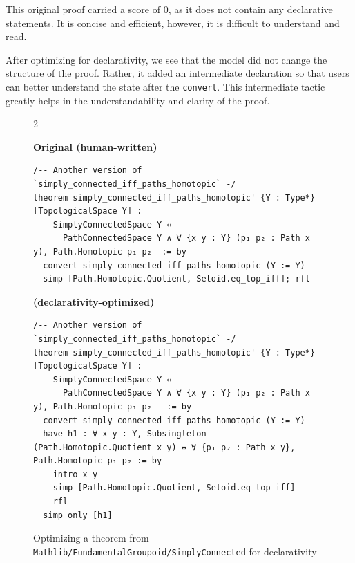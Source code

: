 This original proof carried a score of $0$, as it does not contain any declarative statements. It is concise and efficient, however, it is difficult to understand and read. 

After optimizing for declarativity, we see that the model did not change the structure of the proof. Rather, it added an intermediate declaration so that users can better understand the state after the \texttt{convert}. This intermediate tactic greatly helps in the understandability and clarity of the proof.


\setlength{\columnsep}{0.2cm}
\begin{figure}[ht]
\begin{multicols}{2}

{
\textbf{Original (human-written)}
\begin{scriptsize}
\begin{lstlisting}[basicstyle=\scriptsize\ttfamily]
/-- Another version of `simply_connected_iff_paths_homotopic` -/
theorem simply_connected_iff_paths_homotopic' {Y : Type*} [TopologicalSpace Y] :
    SimplyConnectedSpace Y ↔
      PathConnectedSpace Y ∧ ∀ {x y : Y} (p₁ p₂ : Path x y), Path.Homotopic p₁ p₂  := by
  convert simply_connected_iff_paths_homotopic (Y := Y)
  simp [Path.Homotopic.Quotient, Setoid.eq_top_iff]; rfl
\end{lstlisting}
\end{scriptsize}
}
\vfill\null
\columnbreak
{
\textbf{\methodname{} (declarativity-optimized)}
\begin{scriptsize}
\begin{lstlisting}[basicstyle=\scriptsize\ttfamily]
/-- Another version of `simply_connected_iff_paths_homotopic` -/
theorem simply_connected_iff_paths_homotopic' {Y : Type*} [TopologicalSpace Y] :
    SimplyConnectedSpace Y ↔
      PathConnectedSpace Y ∧ ∀ {x y : Y} (p₁ p₂ : Path x y), Path.Homotopic p₁ p₂   := by
  convert simply_connected_iff_paths_homotopic (Y := Y)
  have h1 : ∀ x y : Y, Subsingleton (Path.Homotopic.Quotient x y) ↔ ∀ {p₁ p₂ : Path x y}, Path.Homotopic p₁ p₂ := by
    intro x y
    simp [Path.Homotopic.Quotient, Setoid.eq_top_iff]
    rfl
  simp only [h1]
\end{lstlisting}
\end{scriptsize}
}
\end{multicols}
\vspace{-2.5em}
\caption{Optimizing a theorem from \texttt{Mathlib/FundamentalGroupoid/SimplyConnected} for declarativity}
\vspace{-1em}
\label{fig:mathlib-read}
\end{figure}




